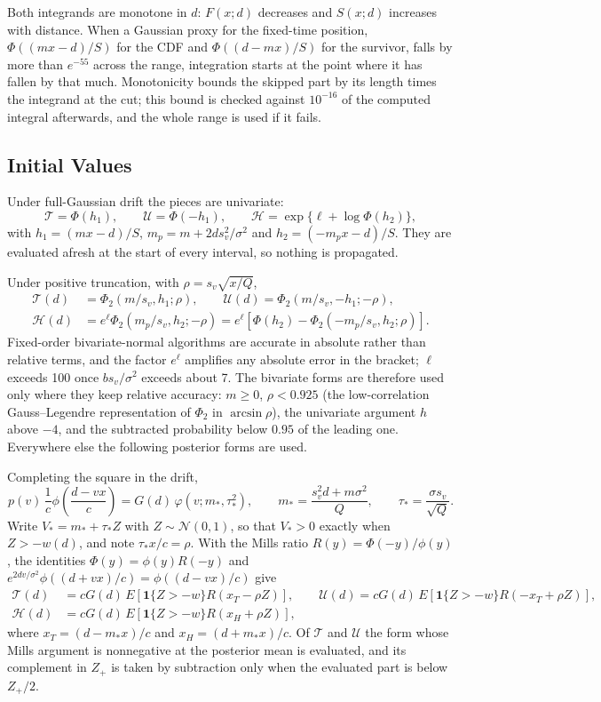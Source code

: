 \documentclass[12pt]{article}
\newcommand{\Normal}{\mathcal{N}}
\newcommand{\PhiN}{\Phi}
\newcommand{\phiN}{\phi}
\newcommand{\PhiTwo}{\Phi_2}
\begin{document}
Both integrands are monotone in $d$: $F(x;d)$ decreases and $S(x;d)$ increases with distance. When a Gaussian proxy for the fixed-time position, $\PhiN((mx-d)/S)$ for the CDF and $\PhiN((d-mx)/S)$ for the survivor, falls by more than $e^{-55}$ across the range, integration starts at the point where it has fallen by that much. Monotonicity bounds the skipped part by its length times the integrand at the cut; this bound is checked against $10^{-16}$ of the computed integral afterwards, and the whole range is used if it fails.

\subsection{Initial Values}
Under full-Gaussian drift the pieces are univariate:
\begin{equation}
 \mathcal T=\PhiN(h_1),\qquad \mathcal U=\PhiN(-h_1),\qquad
 \mathcal H=\exp\{\ell+\log\PhiN(h_2)\},
\end{equation}
with $h_1=(mx-d)/S$, $m_p=m+2ds_v^2/\sigma^2$ and $h_2=(-m_px-d)/S$. They are evaluated afresh at the start of every interval, so nothing is propagated.

Under positive truncation, with $\rho=s_v\sqrt{x/Q}$,
\begin{align}
 \mathcal T(d)&=\PhiTwo(m/s_v,h_1;\rho),\qquad
 \mathcal U(d)=\PhiTwo(m/s_v,-h_1;-\rho),\\
 \mathcal H(d)&=e^\ell\PhiTwo(m_p/s_v,h_2;-\rho)
 =e^{\ell}\left[\PhiN(h_2)-\PhiTwo(-m_p/s_v,h_2;\rho)\right].
\end{align}
Fixed-order bivariate-normal algorithms are accurate in absolute rather than relative terms, and the factor $e^{\ell}$ amplifies any absolute error in the bracket; $\ell$ exceeds 100 once $bs_v/\sigma^2$ exceeds about 7. The bivariate forms are therefore used only where they keep relative accuracy: $m\ge0$, $\rho<0.925$ (the low-correlation Gauss--Legendre representation of $\PhiTwo$ in $\arcsin\rho$), the univariate argument $h$ above $-4$, and the subtracted probability below $0.95$ of the leading one. Everywhere else the following posterior forms are used.

Completing the square in the drift,
\[
 p(v)\,\frac{1}{c}\phiN\!\left(\frac{d-vx}{c}\right)=G(d)\,\varphi(v;m_*,\tau_*^2),
 \qquad
 m_*=\frac{s_v^2d+m\sigma^2}{Q},\qquad
 \tau_*=\frac{\sigma s_v}{\sqrt Q}.
\]
Write $V_*=m_*+\tau_*Z$ with $Z\sim\Normal(0,1)$, so that $V_*>0$ exactly when $Z>-w(d)$, and note $\tau_*x/c=\rho$. With the Mills ratio $R(y)=\PhiN(-y)/\phiN(y)$, the identities $\PhiN(y)=\phiN(y)R(-y)$ and $e^{2dv/\sigma^2}\phiN((d+vx)/c)=\phiN((d-vx)/c)$ give
\begin{align}
 \mathcal T(d)&=cG(d)\,E\left[\mathbf1\{Z>-w\}R(x_T-\rho Z)\right],\qquad
 \mathcal U(d)=cG(d)\,E\left[\mathbf1\{Z>-w\}R(-x_T+\rho Z)\right],\\
 \mathcal H(d)&=cG(d)\,E\left[\mathbf1\{Z>-w\}R(x_H+\rho Z)\right],
 \label{eq:joint-image-seed}
\end{align}
where $x_T=(d-m_*x)/c$ and $x_H=(d+m_*x)/c$. Of $\mathcal T$ and $\mathcal U$ the form whose Mills argument is nonnegative at the posterior mean is evaluated, and its complement in $Z_+$ is taken by subtraction only when the evaluated part is below $Z_+/2$.
\end{document}
